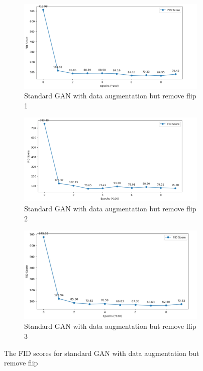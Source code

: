 \begin{figure}[H]
    \centering
    \begin{subfigure}[b]{\linewidth}
        \centering
        \includegraphics[width=0.84\linewidth]{./Images/data_augementation_remove_flip1.jpg}
        \caption{Standard GAN with data augmentation but remove flip 1}
        \label{fig:Dense}
    \end{subfigure}
    \vspace{0.05\linewidth} 
    \begin{subfigure}[b]{\linewidth}
        \centering
        \includegraphics[width=0.8\linewidth]{./Images/data_augementation_remove_flip2.jpg}
        \caption{Standard GAN with data augmentation but remove flip 2}
        \label{fig:Conv2DTranspose}
    \end{subfigure}
    \begin{subfigure}[b]{\linewidth}
        \centering
        \includegraphics[width=0.8\linewidth]{./Images/data_augementation_remove_flip3.jpg}
        \caption{Standard GAN with data augmentation but remove flip 3}
        \label{fig:Conv2DTranspose}
    \end{subfigure}
    \caption{The FID scores for standard GAN with data augmentation but remove flip}
    \label{fig:combined}
\end{figure}


